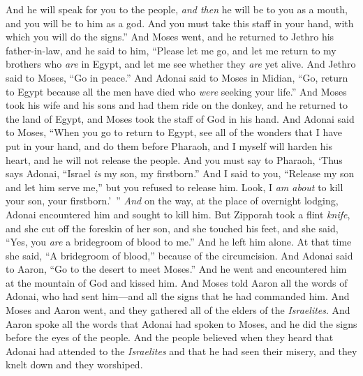 \begin{biblechapter}
\verse And he will speak for you to the people, \textit{and then} he will be to you as a mouth, and you will be to him as a god.
\verse And you must take this staff in your hand, with which you will do the signs.”
 And Moses went, and he returned to Jethro his father-in-law, and he said to him, “Please let me go, and let me return to my brothers who \textit{are} in Egypt, and let me see whether they \textit{are} yet alive. And Jethro said to Moses, “Go in peace.”
\verse And Adonai said to Moses in Midian, “Go, return to Egypt because all the men have died who \textit{were} seeking your life.”
\verse And Moses took his wife and his sons and had them ride on the donkey, and he returned to the land of Egypt, and Moses took the staff of God in his hand.
\verse And Adonai said to Moses, “When you go to return to Egypt, see all of the wonders that I have put in your hand, and do them before Pharaoh, and I myself will harden his heart, and he will not release the people.
\verse And you must say to Pharaoh, ‘Thus says Adonai, “Israel \textit{is} my son, my firstborn.”
\verse And I said to you, “Release my son and let him serve me,” but you refused to release him. Look, I \textit{am about} to kill your son, your firstborn.’ ”
\verse \textit{And} on the way, at the place of overnight lodging, Adonai encountered him and sought to kill him.
\verse But Zipporah took a flint \textit{knife}, and she cut off the foreskin of her son, and she touched his feet, and she said, “Yes, you \textit{are} a bridegroom of blood to me.”
\verse And he left him alone. At that time she said, “A bridegroom of blood,” because of the circumcision.
\verse And Adonai said to Aaron, “Go to the desert to meet Moses.” And he went and encountered him at the mountain of God and kissed him.
\verse And Moses told Aaron all the words of Adonai, who had sent him—and all the signs that he had commanded him.
\verse And Moses and Aaron went, and they gathered all of the elders of the \textit{Israelites}.
\verse And Aaron spoke all the words that Adonai had spoken to Moses, and he did the signs before the eyes of the people.
\verse And the people believed when they heard that Adonai had attended to the \textit{Israelites} and that he had seen their misery, and they knelt down and they worshiped.
\end{biblechapter}

